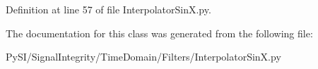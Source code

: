 Definition at line 57 of file Interpolator\+Sin\+X.\+py.



The documentation for this class was generated from the following file\+:\begin{DoxyCompactItemize}
\item 
Py\+S\+I/\+Signal\+Integrity/\+Time\+Domain/\+Filters/Interpolator\+Sin\+X.\+py\end{DoxyCompactItemize}
